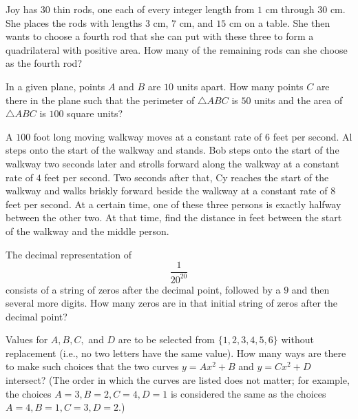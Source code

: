 \documentclass[mast]{lucky}
\begin{document}
\begin{prob}[AMC 10A 2017/10]{2}
Joy has $30$ thin rods, one each of every integer length from $1$ cm through $30$ cm. She places the rods with lengths $3$ cm, $7$ cm, and $15$ cm on a table. She then wants to choose a fourth rod that she can put with these three to form a quadrilateral with positive area. How many of the remaining rods can she choose as the fourth rod?
\end{prob}

\begin{prob}[AMC 10B 2019/10]{3}
In a given plane, points $A$ and $B$ are $10$ units apart. How many points $C$ are there in the plane such that the perimeter of $\triangle ABC$ is $50$ units and the area of $\triangle ABC$ is $100$ square units?
\end{prob}

\begin{prob}[AIME I 2007/2]{3}
A $100$ foot long moving walkway moves at a constant rate of $6$ feet per second. Al steps onto the start of the walkway and stands. Bob steps onto the start of the walkway two seconds later and strolls forward along the walkway at a constant rate of $4$ feet per second. Two seconds after that, Cy reaches the start of the walkway and walks briskly forward beside the walkway at a constant rate of $8$ feet per second. At a certain time, one of these three persons is exactly halfway between the other two. At that time, find the distance in feet between the start of the walkway and the middle person.
\end{prob}

\begin{prob}[AMC 10B 2020/12]{3}
The decimal representation of\[\dfrac{1}{20^{20}}\]consists of a string of zeros after the decimal point, followed by a $9$ and then several more digits. How many zeros are in that initial string of zeros after the decimal point?
\end{prob}

\begin{prob}[AMC 10A 2021/15]{3}
Values for $A, B, C,$ and $D$ are to be selected from $\{1, 2, 3, 4, 5, 6 \}$ without replacement (i.e., no two letters have the same value). How many ways are there to make such choices that the two curves $y=Ax^2+B$ and $y=Cx^2+D$ intersect? (The order in which the curves are listed does not matter; for example, the choices $A=3, B=2, C=4, D=1$ is considered the same as the choices $A=4, B=1, C=3, D=2.$)
\end{prob}
\end{document}
